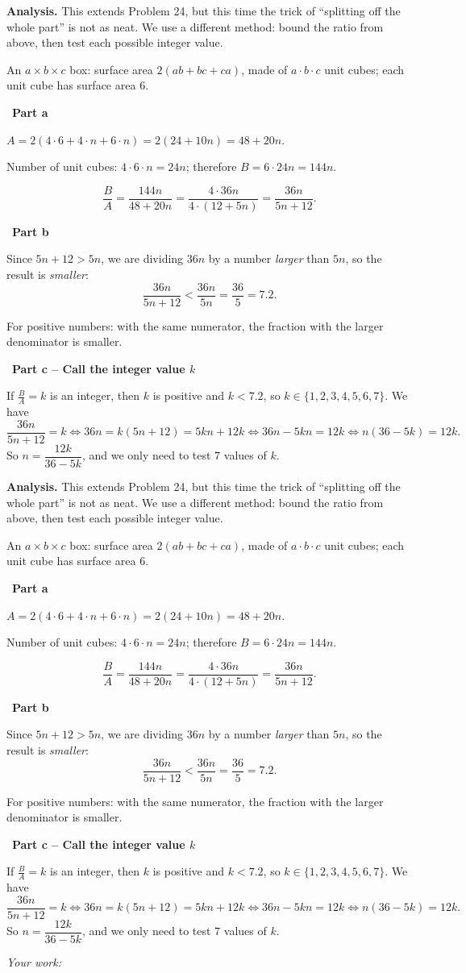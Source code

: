 \documentclass[11pt]{article}
\newif\ifsol \soltrue
\newcommand{\StuProb}[2]{\begin{probboxS}{#1}{#2}\StuProbBody\end{probboxS}}
\newcommand{\probsol}[1]{%
  \begin{lrbox}{\solmeasure}\begin{minipage}{\dimexpr\linewidth-24pt\relax}#1\end{minipage}\end{lrbox}%
  \ifsol
    \begin{solbox}#1\end{solbox}%
  \else
    \setlength{\solht}{\dimexpr\ht\solmeasure+\dp\solmeasure+0.85cm\relax}%
    \ifdim\solht<1.35cm\setlength{\solht}{1.35cm}\fi
    \ifdim\solht>\StudentMaxWork\setlength{\solht}{\StudentMaxWork}\fi
    \par\noindent\begin{minipage}{\linewidth}%
    \expandafter\StuProb\StuProbArgs
    \begin{tcolorbox}[colback=white,colframe=Line,boxrule=0.8pt,arc=5pt,
      left=8pt,right=8pt,top=4pt,bottom=4pt,height=\solht]{\footnotesize\color{Slate}\itshape\WorkWord}\end{tcolorbox}%
    \end{minipage}\par\medskip
  \fi}
\newlength{\StudentMaxWork}\setlength{\StudentMaxWork}{4.5cm}
\newcommand{\step}[2]{\par\smallskip\noindent{\bfseries\color{tmBlue!85!black}\StepWord~#1.}\ {\bfseries #2}\par\nopagebreak}
\def\WorkWord{Your work:}
\def\StepWord{Step}
\begin{document}
\probsol{
\textbf{Analysis.} This extends Problem 24, but this time the trick of ``splitting off the whole part'' is not as neat. We use a different method: bound the ratio from above, then test each possible integer value.
\begin{recallbox}An $a\times b\times c$ box: surface area $2(ab+bc+ca)$, made of $a\cdot b\cdot c$ unit cubes; each unit cube has surface area $6$.\end{recallbox}

\step{1}{Part a}
$A=2(4\cdot 6+4\cdot n+6\cdot n)=2(24+10n)=48+20n$.\par
Number of unit cubes: $4\cdot 6\cdot n=24n$; therefore $B=6\cdot 24n=144n$.\par
\[ \frac{B}{A}=\frac{144n}{48+20n}=\frac{4\cdot 36n}{4\cdot(12+5n)}=\frac{36n}{5n+12}. \]

\step{2}{Part b}
Since $5n+12>5n$, we are dividing $36n$ by a number \emph{larger} than $5n$, so the result is \emph{smaller}:
\[ \frac{36n}{5n+12}<\frac{36n}{5n}=\frac{36}{5}=7.2. \]
\begin{recallbox}For positive numbers: with the same numerator, the fraction with the larger denominator is smaller.\end{recallbox}

\step{3}{Part c -- Call the integer value $k$}
If $\frac{B}{A}=k$ is an integer, then $k$ is positive and $k<7.2$, so $k\in\{1,2,3,4,5,6,7\}$. We have
\[ \frac{36n}{5n+12}=k \iff 36n=k(5n+12)=5kn+12k \iff 36n-5kn=12k \iff n(36-5k)=12k. \]
So $n=\dfrac{12k}{36-5k}$, and we only need to test $7$ values of $k$.

}
\end{document}
